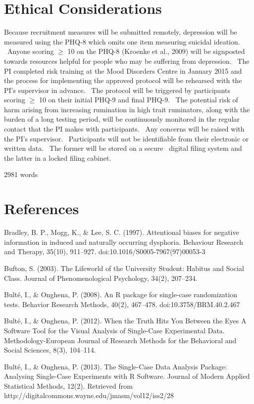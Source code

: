 \documentclass[man,a4paper,biblatex]{apa6}
\begin{document}
\section{Ethical Considerations}
Because recruitment measures will be submitted remotely, depression will be measured using the PHQ-8 which omits one item measuring suicidal ideation. \ Anyone scoring ${\geq}$ 10 on the PHQ-8 (Kroenke et al., 2009) will be signposted towards resources helpful for people who may be suffering from depression. \ The PI completed risk training at the Mood Disorders Centre in January 2015 and the process for implementing the approved protocol will be rehearsed with the PI's supervisor in advance. \ The protocol will be triggered by participants scoring ${\geq}$ 10 on their initial PHQ-9 and final PHQ-9. \ The potential risk of harm arising from increasing rumination in high trait ruminators, along with the burden of a long testing period, will be continuously monitored in the regular contact that the PI makes with participants. \ Any concerns will be raised with the PI's supervisor. \ Participants will not be identifiable from their electronic or written data. \ The former will be stored on a secure \ digital filing system and the latter in a locked filing cabinet.


\bigskip

2981 words


\bigskip

\clearpage\section{References}
Bradley, B. P., Mogg, K., \& Lee, S. C. (1997). Attentional biases for negative information in induced and naturally occurring dysphoria. Behaviour Research and Therapy, 35(10), 911--927. doi:10.1016/S0005-7967(97)00053-3

Bufton, S. (2003). The Lifeworld of the University Student: Habitus and Social Class. Journal of Phenomenological Psychology, 34(2), 207--234.

Bult\'e, I., \& Onghena, P. (2008). An R package for single-case randomization tests. Behavior Research Methods, 40(2), 467--478. doi:10.3758/BRM.40.2.467

Bult\'e, I., \& Onghena, P. (2012). When the Truth Hits You Between the Eyes A Software Tool for the Visual Analysis of Single-Case Experimental Data. Methodology-European Journal of Research Methods for the Behavioral and Social Sciences, 8(3), 104--114.

Bult\'e, I., \& Onghena, P. (2013). The Single-Case Data Analysis Package: Analysing Single-Case Experiments with R Software. Journal of Modern Applied Statistical Methods, 12(2). Retrieved from http://digitalcommons.wayne.edu/jmasm/vol12/iss2/28
\end{document}
